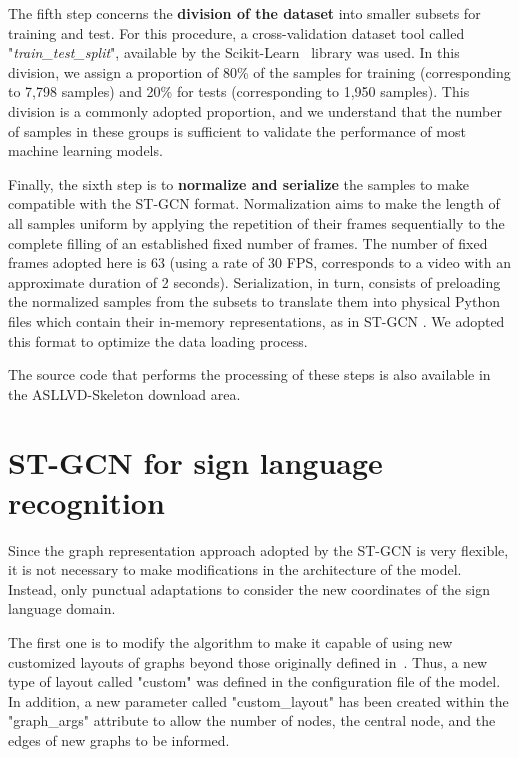 The fifth step concerns the \textbf{division of the dataset} into smaller subsets for training and test. For this procedure, a cross-validation dataset tool called "\textit{train\_test\_split}", available by the Scikit-Learn~\cite{scikit-learn} library was used. In this division, we assign a proportion of 80\% of the samples for training (corresponding to 7,798 samples) and 20\% for tests (corresponding to 1,950 samples). This division is a commonly adopted proportion, and we understand that the number of samples in these groups is sufficient to validate the performance of most machine learning models.

Finally, the sixth step is to \textbf{normalize and serialize} the samples to make compatible with the ST-GCN format. Normalization aims to make the length of all samples uniform by applying the repetition of their frames sequentially to the complete filling of an established fixed number of frames. The number of fixed frames adopted here is 63 (using a rate of 30 FPS, corresponds to a video with an approximate duration of 2 seconds). Serialization, in turn, consists of preloading the normalized samples from the subsets to translate them into physical Python~\cite{python} files which contain their in-memory representations, as in ST-GCN \cite{st-gcn-2018}. We adopted this format to optimize the data loading process. %

The source code that performs the processing of these steps is also available in the ASLLVD-Skeleton download area.


\section{ST-GCN for sign language recognition} 
\label{sec:st-gcn-for-sl-recognition}

Since the graph representation approach adopted by the ST-GCN is very flexible, it is not necessary to make modifications in the architecture of the model. Instead, only punctual adaptations to consider the new coordinates of the sign language domain.

The first one is to modify the algorithm to make it capable of using new customized layouts of graphs beyond those originally defined in~\cite{st-gcn-2018}. Thus, a new type of layout called "custom" was defined in the configuration file of the model. In addition, a new parameter called "custom\_layout" has been created within the "graph\_args" attribute to allow the number of nodes, the central node, and the edges of new graphs to be informed.

